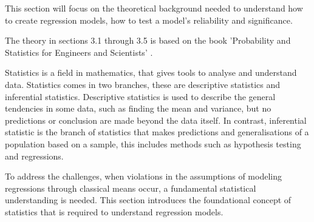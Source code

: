 This section will focus on the theoretical background needed to understand how to create regression models, how to test a model's reliability and significance.

\noindent The theory in sections 3.1 through 3.5 is based on the book 'Probability and Statistics for Engineers and Scientists' \cite{ProbAndStat}. \newline

\noindent Statistics is a field in mathematics, that gives tools to analyse and understand data. Statistics comes in two branches, these are descriptive statistics and inferential statistics. Descriptive statistics is used to describe the general tendencies in some data, such as finding the mean and variance, but no predictions or conclusion are made beyond the data itself. In contrast, inferential statistic is the branch of statistics that makes predictions and generalisations of a population based on a sample, this includes methods such as hypothesis testing and regressions. \newline

\noindent To address the challenges, when violations in the assumptions of modeling regressions through classical means occur, a fundamental statistical understanding is needed. This section introduces the foundational concept of statistics that is required to understand regression models.






\newpage

